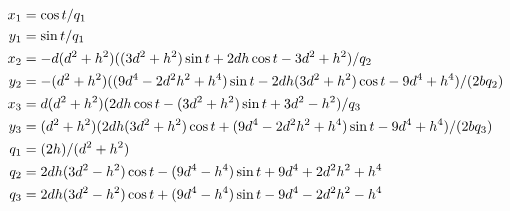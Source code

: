 {\small  
\begin{equation}
    \aligned
    x_1 &= \cos{t}/q_1\\
    y_1 &= \sin{t}/q_1 \\
    x_2 &= -d (d^2 + h^2) ((3 d^2 + h^2)\sin{t} + 2d h \cos{t}- 3 d^2 + h^2)/q_2 \\
    y_2&=-(d^2 + h^2) ((9 d^4 - 2 d^2 h^2 + h^4)\sin{t} - 2 d h (3 d^2 + h^2)\cos{t} - 9 d^4 + h^4)/(2 b q_2) \\
    x_3 &= d (d^2 + h^2) (2 d h \cos{t} - (3 d^2 + h^2) \sin{t} + 3 d^2 - h^2)/q_3\\
    y_3 &=(d^2 + h^2) (2d h (3 d^2 + h^2) \cos{t}+ (9 d^4 - 2 d^2 h^2 + h^4)\sin{t} - 9 d^4 + h^4)/(2 b q_3) \\
    q_1&=(2h)/(d^2+h^2)\\
    q_2&= 2 d h (3 d^2 - h^2)\cos{t} - (9 d^4 - h^4) \sin{t}  + 9 d^4 + 2 d^2 h^2 + h^4\\
    q_3&= 2 d h (3 d^2 - h^2)\cos{t} + (9 d^4 - h^4)\sin{t} - 9 d^4 - 2 d^2 h^2 - h^4
\endaligned
\label{eqn:03-vertices-brocard}
\end{equation}
}


